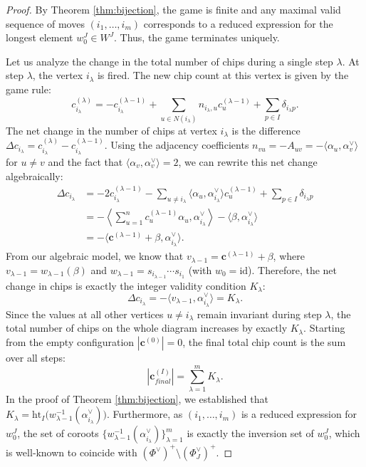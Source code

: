 \documentclass[11pt,a4paper]{amsart}
\theoremstyle{plain}
\theoremstyle{definition}
\theoremstyle{remark}
\begin{document}
\begin{proof}
    By Theorem \ref{thm:bijection}, the game is finite and any maximal valid sequence of moves $(i_1, \dots, i_m)$ corresponds to a reduced expression for the longest element $w_0^J \in W^J$. Thus, the game terminates uniquely.
    
    Let us analyze the change in the total number of chips during a single step $\lambda$. At step $\lambda$, the vertex $i_\lambda$ is fired. The new chip count at this vertex is given by the game rule:
    \[
    c_{i_\lambda}^{(\lambda)} = -c_{i_\lambda}^{(\lambda-1)} + \sum_{u \in N(i_\lambda)} n_{i_\lambda, u} c_u^{(\lambda-1)} + \sum_{p \in I} \delta_{i_\lambda p}.
    \]
    The net change in the number of chips at vertex $i_\lambda$ is the difference $\Delta c_{i_\lambda} = c_{i_\lambda}^{(\lambda)} - c_{i_\lambda}^{(\lambda-1)}$. Using the adjacency coefficients $n_{vu} = -A_{uv} = -\langle \alpha_u, \alpha_v^\vee \rangle$ for $u \neq v$ and the fact that $\langle \alpha_v, \alpha_v^\vee \rangle = 2$, we can rewrite this net change algebraically:
    \begin{align*}
        \Delta c_{i_\lambda} 
        &= -2c_{i_\lambda}^{(\lambda-1)} - \sum_{u \neq i_\lambda} \langle \alpha_u, \alpha_{i_\lambda}^\vee \rangle c_u^{(\lambda-1)} + \sum_{p \in I} \delta_{i_\lambda p} \\
        &= -\left\langle \sum_{u=1}^n c_u^{(\lambda-1)} \alpha_u, \alpha_{i_\lambda}^\vee \right\rangle - \langle \beta, \alpha_{i_\lambda}^\vee \rangle \\
        &= -\langle \mathbf{c}^{(\lambda-1)} + \beta, \alpha_{i_\lambda}^\vee \rangle.
    \end{align*}
    From our algebraic model, we know that $v_{\lambda-1} = \mathbf{c}^{(\lambda-1)} + \beta$, where $v_{\lambda-1} = w_{\lambda-1}(\beta)$ and $w_{\lambda-1} = s_{i_{\lambda-1}} \cdots s_{i_1}$ (with $w_0 = \mathrm{id}$). Therefore, the net change in chips is exactly the integer validity condition $K_\lambda$:
    \[
    \Delta c_{i_\lambda} = -\langle v_{\lambda-1}, \alpha_{i_\lambda}^\vee \rangle = K_\lambda.
    \]
    Since the values at all other vertices $u \neq i_\lambda$ remain invariant during step $\lambda$, the total number of chips on the whole diagram increases by exactly $K_\lambda$. Starting from the empty configuration $|\mathbf{c}^{(0)}| = 0$, the final total chip count is the sum over all steps:
    \[
    |\mathbf{c}_{final}^{(I)}| = \sum_{\lambda=1}^m K_\lambda.
    \]
    In the proof of Theorem \ref{thm:bijection}, we established that $K_\lambda = \mathrm{ht}_I\bigl(w_{\lambda-1}^{-1}(\alpha_{i_\lambda}^\vee)\bigr)$. 
    Furthermore, as $(i_1, \dots, i_m)$ is a reduced expression for $w_0^J$, the set of coroots $\{ w_{\lambda-1}^{-1}(\alpha_{i_\lambda}^\vee) \}_{\lambda=1}^m$ is exactly the inversion set of $w_0^J$, which is well‑known to coincide with $(\Phi^\vee)^+ \setminus (\Phi_J^\vee)^+$.
    

\end{proof}
\end{document}
